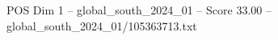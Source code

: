 \begin{textsample}{POS Dim 1 – global\_south\_2024\_01 – Score 33.00 – global\_south\_2024\_01/105363713.txt}
\end{textsample}
